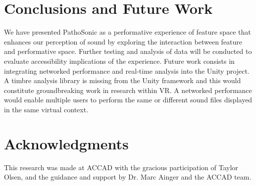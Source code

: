 \documentclass{nime-alternate}
\begin{document}


\section{Conclusions and Future Work}

We have presented PathoSonic as a performative experience of feature space that enhances our perception of sound by exploring the interaction between feature and performative space. Further testing and analysis of data will be conducted to evaluate accessibility implications of the experience. Future work consists in integrating networked performance and real-time analysis into the Unity project. A timbre analysis library is missing from the Unity framework and this would constitute groundbreaking work in research within VR. A networked performance would enable multiple users to perform the same or different sound files displayed in the same virtual context. 

\section{Acknowledgments}

This research was made at ACCAD with the gracious participation of Taylor Olsen, and the guidance and support by Dr. Marc Ainger and the ACCAD team.





 
\end{document}
